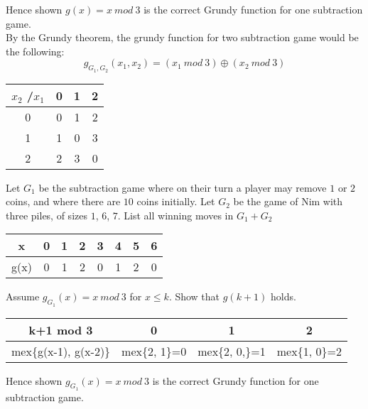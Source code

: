 \documentclass[addpoints,answers]{exam}
\begin{document}
\begin{questions}
\begin{solutionorbox}[\stretch{1}]
							Hence shown $g(x) = x\ mod\ 3$ is the correct Grundy function for one
							subtraction game.\\
							By the Grundy theorem, the grundy function for two subtraction
							game would be the following: 
							\begin{equation*}
								g_{G_1, G_2}(x_1, x_2) = (x_1\ mod\ 3)\oplus (x_2\ mod\ 3)
							\end{equation*}
							\begin{center}
							\begin{tabular}{c|c c c}
								$x_2$ \slash $x_1$& 0 & 1 & 2\\
								\hline
								0 & 0 & 1 & 2\\
								1 & 1 & 0 & 3\\
								2 & 2 & 3 & 0\\
							\end{tabular}
							\end{center}

            \end{solutionorbox}
            \newpage
 
        \question
            Let $G_1$ be the subtraction game where on their turn a player may
            remove $1$ or $2$ coins, and where there are $10$ coins initially. Let $G_2$ be
            the game of Nim with three piles, of sizes $1$, $6$, $7$. List all winning moves
            in $G_1 + G_2$
            \begin{solutionorbox}[\stretch{1}]
							\begin{center}
							\begin{tabular}{c||c|c|c|c|c|c|c}
								x & 0 & 1 & 2 & 3 & 4 & 5 & 6\\
								\hline
								g(x) & 0 & 1 & 2 & 0 & 1 & 2 & 0 
							\end{tabular}
							\end{center}
							Assume $g_{G_1}(x) = x\ mod\ 3$ for $x \le k$. Show that $g(k+1)$
							holds.
							\begin{center}
							\begin{tabular}{c||c|c|c}
								k+1 mod 3 & 0 & 1 & 2\\
								\hline
								mex\{g(x-1), g(x-2)\} & mex\{2, 1\}=0 & mex\{2, 0,\}=1 & mex\{1, 0\}=2
							\end{tabular}
							\end{center}

							Hence shown $g_{G_1}(x) = x\ mod\ 3$ is the correct Grundy function for one
							subtraction game.\\\\


\end{solutionorbox}
\end{questions}
\end{document}
